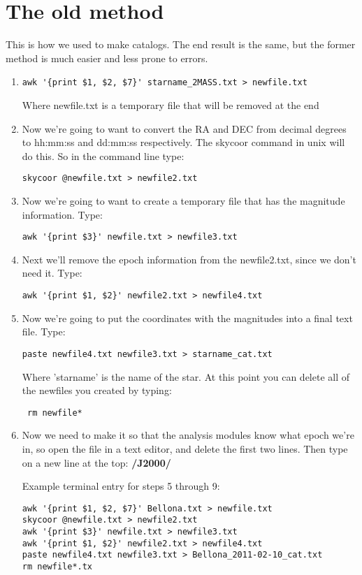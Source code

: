 \documentclass[10pt,preprint]{article}
\begin{document}
\newpage

\section{The old method}
This is how we used to make catalogs. The end result is the same, but the former method is much easier and less prone to errors.


\begin{enumerate}
\item
\begin{verbatim}
awk '{print $1, $2, $7}' starname_2MASS.txt > newfile.txt
\end{verbatim}
 Where newfile.txt is a temporary file that will be removed at the end
\item Now we're going to want to convert the RA and DEC from decimal degrees to hh:mm:ss and dd:mm:ss respectively. The skycoor command in unix will do this. So in the command line type: 
\begin{verbatim}
skycoor @newfile.txt > newfile2.txt
\end{verbatim}
\item Now we're going to want to create a temporary file that has the magnitude information. Type: 
\begin{verbatim}
awk '{print $3}' newfile.txt > newfile3.txt
\end{verbatim}
\item Next we'll remove the epoch information from the newfile2.txt, since we don't need it. Type: 
\begin{verbatim}
awk '{print $1, $2}' newfile2.txt > newfile4.txt
\end{verbatim}
\item Now we're going to put the coordinates with the magnitudes into a final text file. Type: 
\begin{verbatim}
paste newfile4.txt newfile3.txt > starname_cat.txt
\end{verbatim}
Where 'starname' is the name of the star. At this point you can delete all of the newfiles you created by typing:
\begin{verbatim}
 rm newfile* 
\end{verbatim}
\item Now we need to make it so that the analysis modules know what epoch we're in, so open the file in a text editor, and delete the first two lines. Then type on a new line at the top: \textbf{/J2000/}

\noindent Example terminal entry for steps 5 through 9:
\begin{verbatim}
awk '{print $1, $2, $7}' Bellona.txt > newfile.txt
skycoor @newfile.txt > newfile2.txt
awk '{print $3}' newfile.txt > newfile3.txt
awk '{print $1, $2}' newfile2.txt > newfile4.txt
paste newfile4.txt newfile3.txt > Bellona_2011-02-10_cat.txt
rm newfile*.tx
\end{verbatim}

\end{enumerate}
\end{document}
